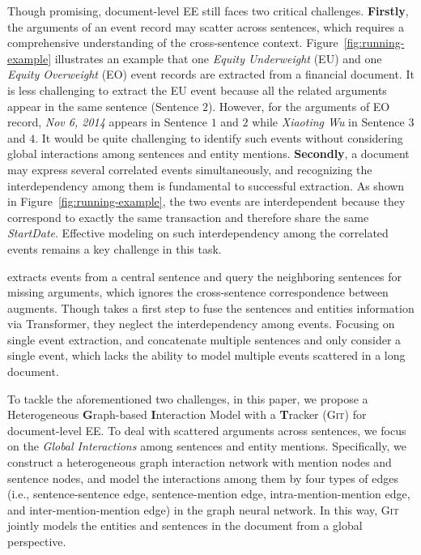 \documentclass[11pt,a4paper]{article}
\newcommand{\modelname}{\textsc{Git}\xspace}
\begin{document}
Though promising, document-level EE still faces two critical challenges.
\textbf{Firstly}, the arguments of an event record may scatter across sentences, which requires a comprehensive understanding of the cross-sentence context.
Figure~\ref{fig:running-example} illustrates an example that one \textit{Equity Underweight} (EU) and one \textit{Equity Overweight} (EO) event records are extracted from a financial document.
It is less challenging to extract the EU event because all the related arguments appear in the same sentence (Sentence $2$).
However, for the arguments of EO record, \textit{Nov 6, 2014} appears in Sentence $1$ and $2$ while \textit{Xiaoting Wu} in Sentence $3$ and $4$.
It would be quite challenging to identify such events without considering global interactions among sentences and entity mentions.
\textbf{Secondly}, a document may express several correlated events simultaneously, and recognizing the interdependency among them is fundamental to successful extraction.
As shown in Figure~\ref{fig:running-example}, the two events are interdependent because they correspond to exactly the same transaction and therefore share the same \textit{StartDate}.
Effective modeling on such interdependency among the correlated events remains a key challenge in this task.




\citet{yang-etal-2018-dcfee} extracts events from a central sentence and query the neighboring sentences for missing arguments, which ignores the cross-sentence correspondence between augments.
Though \citet{zheng-etal-2019-doc2edag} takes a first step to fuse the sentences and entities information via Transformer, they neglect the interdependency among events. 
Focusing on single event extraction, \citet{du-cardie-2020-document} and \citet{DBLP:journals/corr/abs-2008-09249} concatenate multiple sentences and only consider a single event, which lacks the ability to model multiple events scattered in a long document.

To tackle the aforementioned two challenges, in this paper, we propose a Heterogeneous \textbf{G}raph-based \textbf{I}nteraction Model with a \textbf{T}racker (\modelname) for document-level EE.
To deal with scattered arguments across sentences, we focus on the \emph{Global Interactions} among sentences and  entity mentions.
Specifically, we construct a heterogeneous graph interaction network with mention nodes and sentence nodes, and model the interactions among them by four types of edges (i.e., sentence-sentence edge, sentence-mention edge, intra-mention-mention edge, and inter-mention-mention edge) in the graph neural network.
In this way, \modelname jointly models the entities and sentences in the document from a global perspective.
\end{document}
